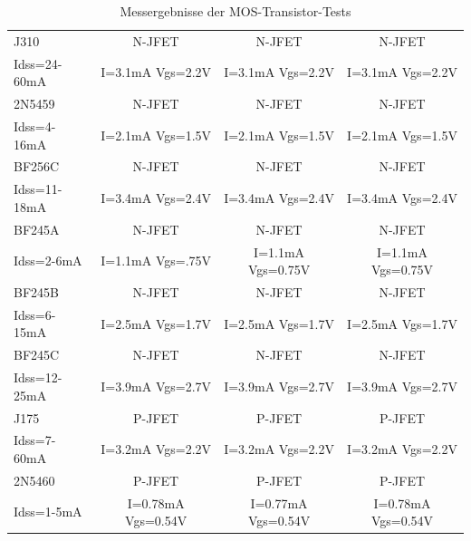 \begin{table}[H]
\begin{center}
\begin{tabular}{| l | c | c | c |}
    \hline
J310         & N-JFET           & N-JFET           & N-JFET\\
Idss=24-60mA & I=3.1mA Vgs=2.2V & I=3.1mA Vgs=2.2V & I=3.1mA Vgs=2.2V \\
    \hline
2N5459       & N-JFET           & N-JFET           & N-JFET\\
Idss=4-16mA & I=2.1mA Vgs=1.5V & I=2.1mA Vgs=1.5V & I=2.1mA Vgs=1.5V \\
    \hline
BF256C       & N-JFET           & N-JFET           & N-JFET\\
Idss=11-18mA & I=3.4mA Vgs=2.4V & I=3.4mA Vgs=2.4V & I=3.4mA Vgs=2.4V \\
    \hline
BF245A       & N-JFET           & N-JFET           & N-JFET\\
Idss=2-6mA   & I=1.1mA Vgs=.75V & I=1.1mA Vgs=0.75V & I=1.1mA Vgs=0.75V \\
    \hline
BF245B       & N-JFET           & N-JFET           & N-JFET\\
Idss=6-15mA  & I=2.5mA Vgs=1.7V & I=2.5mA Vgs=1.7V & I=2.5mA Vgs=1.7V \\
    \hline
BF245C       & N-JFET           & N-JFET           & N-JFET\\
Idss=12-25mA & I=3.9mA Vgs=2.7V & I=3.9mA Vgs=2.7V & I=3.9mA Vgs=2.7V \\
    \hline
J175        & P-JFET           & P-JFET           & P-JFET\\
Idss=7-60mA & I=3.2mA Vgs=2.2V & I=3.2mA Vgs=2.2V & I=3.2mA Vgs=2.2V \\
    \hline
2N5460      & P-JFET           & P-JFET           & P-JFET\\
Idss=1-5mA  & I=0.78mA Vgs=0.54V & I=0.77mA Vgs=0.54V & I=0.78mA Vgs=0.54V \\
    \hline
    \end{tabular}
  \end{center}
  \caption{Messergebnisse der MOS-Transistor-Tests}
  \label{tab:mos} 
\end{table}
